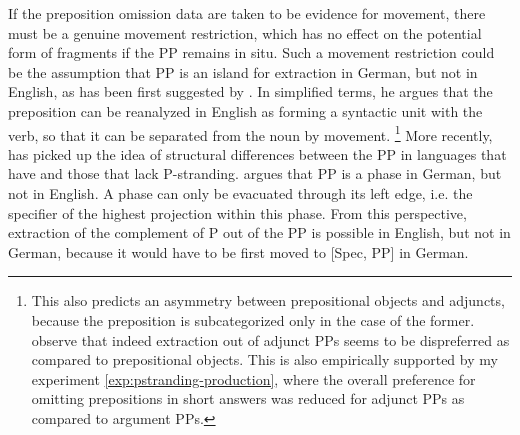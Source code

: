 If the preposition omission data are taken to be evidence for movement, there must be a genuine movement restriction, which has no effect on the potential form of fragments if the PP remains in situ. Such a movement restriction could be the assumption that PP is an island for extraction in German, but not in English, as has been first suggested by \citet{vanriemsdijk1978}. In simplified terms, he argues that the preposition can be reanalyzed in English as forming a syntactic unit with the verb, so that it can be separated from the noun by movement.%
%
\footnote{This also predicts an asymmetry between prepositional objects and adjuncts, because the preposition is subcategorized only in the case of the former. \citet{pullum.huddleston2002} observe that indeed extraction out of adjunct PPs seems to be dispreferred as compared to prepositional objects. This is also empirically supported by my experiment \ref{exp:pstranding-production}, where the overall preference for omitting prepositions in short answers was reduced for adjunct PPs as compared to argument PPs.}\afterfn%
%
More recently, \citet{abels2003} has picked up the idea of structural differences between the PP in languages that have and those that lack P-stranding. \citeauthor{abels2003} argues that PP is a phase in German, but not in English. A phase can only be evacuated through its left edge, i.e. the specifier of the highest projection within this phase. From this perspective, extraction of the complement of P out of the PP is possible in English, but not in German, because it would have to be first moved to [Spec, PP] in German. 

